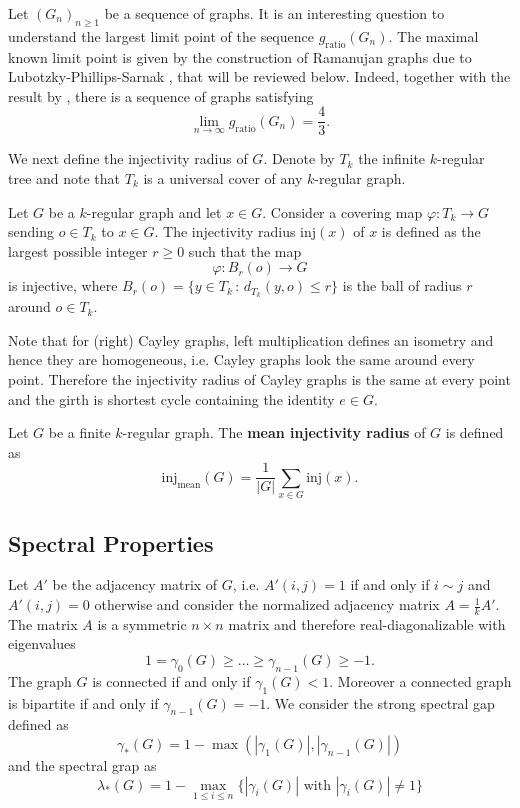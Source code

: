 Let $(G_n)_{n \geq 1}$ be a sequence of graphs. It is an interesting question to understand the largest limit point of the sequence $g_{\mathrm{ratio}}(G_n)$. The maximal known limit point is given by the construction of Ramanujan graphs due to Lubotzky-Phillips-Sarnak \cite{LubotzkyPhillipsSarnak1988}, that will be reviewed below. Indeed, together with the result by \cite{BiggsBoshier1990}, there is a sequence of graphs satisfying  $$\lim_{n \to \infty}  g_{\mathrm{ratio}}(G_n) = \frac{4}{3}.$$

We next define the injectivity radius of $G$. Denote by $T_k$ the infinite $k$-regular tree and note that $T_k$ is a universal cover of any $k$-regular graph.

\begin{definition}
	Let $G$ be a $k$-regular graph and let $x \in G$. Consider a covering map $\varphi: T_k \to G$ sending $o \in T_k$ to $x \in G$. The injectivity radius $\mathrm{inj}(x)$ of $x$ is defined as the largest possible integer $r \geq 0$ such that the map $$\varphi: B_{r}(o)  \to G$$ is injective, where $B_{r}(o) = \{ y \in T_k \,:\, d_{T_k}(y,o) \leq r \}$ is the ball of radius $r$ around $o \in T_k$.
\end{definition}

Note that for (right) Cayley graphs, left multiplication defines an isometry and hence they are homogeneous, i.e. Cayley graphs look the same around every point. Therefore the injectivity radius of Cayley graphs is the same at every point and the girth is shortest cycle containing the identity $e\in G$. 

\begin{definition}
	Let $G$ be a finite $k$-regular graph. The \textbf{mean injectivity radius} of $G$ is defined as $$\mathrm{inj}_{\mathrm{mean}}(G) = \frac{1}{|G|} \sum_{x \in G} \mathrm{inj}(x).$$
\end{definition}

\subsection{Spectral Properties}

Let $A'$ be the adjacency matrix of $G$, i.e. $A'(i,j) = 1$ if and only if $i \sim j$ and $A'(i,j) = 0$ otherwise and consider the normalized adjacency matrix $A = \frac{1}{k}A'.$  The matrix $A$ is a symmetric $n \times n$ matrix and therefore real-diagonalizable with eigenvalues $$1 = \gamma_0(G)\geq  \ldots \geq \gamma_{n-1}(G) \geq -1.$$ The graph $G$ is connected if and only if $\gamma_1(G) < 1$. Moreover a connected graph is bipartite if and only if $\gamma_{n-1}(G) = -1$. We consider the strong spectral gap defined as
$$\gamma_{*}(G)  =  1 - \max(|\gamma_1(G)|,|\gamma_{n-1}(G)|)$$ and the spectral grap as $$\lambda_{*}(G) = 1 - \max_{1 \leq i \leq n}\{ |\gamma_i(G)| \text{ with }  |\gamma_i(G)| \neq 1 \}$$

